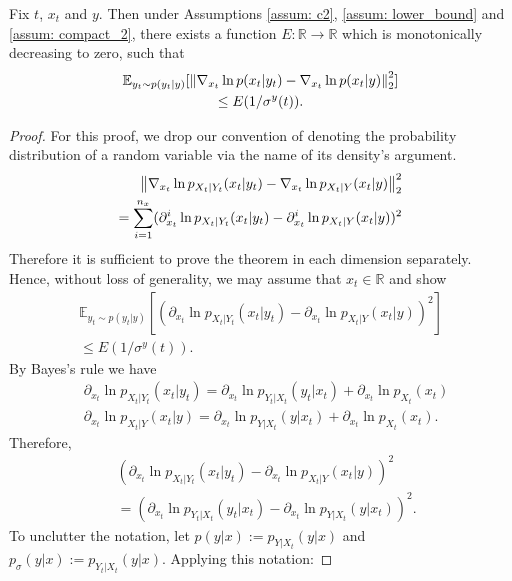 \begin{customthm}{3}
    Fix $t$, $x_t$ and $y$. Then under Assumptions \ref{assum: c2}, \ref{assum: lower_bound} and \ref{assum: compact_2}, there exists a function $E: \mathbb{R} \xrightarrow{} \mathbb{R}$ which is monotonically decreasing to zero, such that
    \begin{gather*}
        \mathbb{E}_{y_t \sim p(y_t|y)}[
            \left\lVert  \nabla_{x_t} \ln p(x_t|y_t) - \nabla_{x_t} \ln p(x_t|y) \right\rVert_2^2
            ] \\
            \leq E(1/\sigma^y(t)).
    \end{gather*}
\end{customthm}
\begin{proof}
    For this proof, we drop our convention of denoting the probability distribution of a random variable via the name of its density’s argument.
    \begin{align*}
        \left\lVert  \nabla_{x_t} \ln p_{X_t | Y_t}(x_t|y_t) - \nabla_{x_t} \ln p_{X_t | Y}(x_t|y) \right\rVert_2^2
    \\= \sum_{i=1}^{n_x} ( \partial^i_{x_t} \ln p_{X_t | Y_t}(x_t|y_t) - \partial^i_{x_t} \ln p_{X_t | Y}(x_t|y) )^2
    \end{align*}
    Therefore it is sufficient to prove the theorem in each dimension separately. Hence, without loss of generality, we may assume that $x_t \in \mathbb{R}$ and show
    \begin{gather*}
        \mathbb{E}_{y_t \sim p(y_t|y)}[
            ( \partial_{x_t} \ln p_{X_t | Y_t}(x_t|y_t) - \partial_{x_t} \ln p_{X_t | Y}(x_t|y) )^2
        ]  
        \\ \leq E(1/\sigma^y(t)).
    \end{gather*}
    By Bayes's rule we have
    \begin{align*}
        &\partial_{x_t} \ln p_{X_t | Y_t}(x_t|y_t)  =  \partial_{x_t} \ln p_{Y_t | X_t}(y_t | x_t) + \partial_{x_t} \ln p_{X_t}(x_t)
        \\ &\partial_{x_t} \ln  p_{X_t | Y}(x_t|y)  = \partial_{x_t} \ln p_{Y | X_t}(y | x_t) + \partial_{x_t} \ln p_{X_t}(x_t).
    \end{align*}
    Therefore,
    \begin{align*}
        &(  \partial_{x_t} \ln p_{X_t | Y_t}(x_t|y_t)  - \partial_{x_t} \ln p_{X_t | Y}(x_t|y) )^2
        \\ &= (\partial_{x_t} \ln p_{Y_t | X_t}(y_t | x_t)- \partial_{x_t} \ln p_{Y | X_t}(y | x_t) )^2.
    \end{align*}
    To unclutter the notation, let $p(y | x) := p_{Y | X_t}(y | x)$ and $p_\sigma(y | x) :=  p_{Y_t | X_t}(y | x)$. Applying this notation:

\end{proof}
